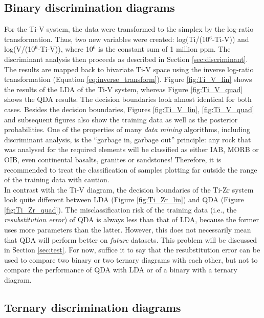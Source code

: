 \documentclass{article}
\begin{document}
\subsection{Binary discrimination diagrams}\label{sec:firstTypeA}

For the Ti-V  system, the data were transformed to  the simplex by the
log-ratio  transformation.   Thus,  two  new variables  were  created:
log(Ti/(10$^6$-Ti-V))  and log(V/(10$^6$-Ti-V)),  where 10$^6$  is the
constant sum of 1 million ppm. The discriminant analysis then proceeds
as described in Section \ref{sec:discriminant}. The results are mapped
back   to   bivariate  Ti-V   space   using   the  inverse   log-ratio
transformation    (Equation    \ref{eq:inverse_transform}).     Figure
\ref{fig:Ti_V_lin} shows  the results of  the LDA of the  Ti-V system,
whereas  Figure  \ref{fig:Ti_V_quad}   shows  the  QDA  results.   The
decision boundaries look almost identical for both cases.  Besides the
decision  boundaries, Figures  \ref{fig:Ti_V_lin}, \ref{fig:Ti_V_quad}
and  subsequent figures also  show the  training data  as well  as the
posterior  probabilities. One  of  the properties  of  many {\it  data
mining} algorithms, including  discriminant analysis, is the ``garbage
in,  garbage out''  principle:  any  rock that  was  analysed for  the
required elements will be classified  as either IAB, MORB or OIB, even
continental  basalts,  granites   or  sandstones!   Therefore,  it  is
recommended  to  treat  the  classification of  samples  plotting  far
outside the range of the training data with caution.\\

In  contrast with  the Ti-V  diagram, the  decision boundaries  of the
Ti-Zr    system   look   quite    different   between    LDA   (Figure
\ref{fig:Ti_Zr_lin})  and   QDA  (Figure  \ref{fig:Ti_Zr_quad}).   The
misclassification  risk   of  the   training  data  (i.e.,   the  {\it
resubstitution error}) of QDA is always less than that of LDA, because
the former  uses more parameters  than the latter. However,  this does
not  necessarily mean  that QDA  will perform  better on  {\it future}
datasets.  This  problem will be discussed  in Section \ref{sec:test}.
For now, suffice  it to say that the resubstitution  error can be used
to compare two binary or two ternary diagrams with each other, but not
to  compare the performance  of QDA  with LDA  or of  a binary  with a
ternary diagram.

\subsection{Ternary discrimination diagrams}\label{sec:secondType}
\end{document}
